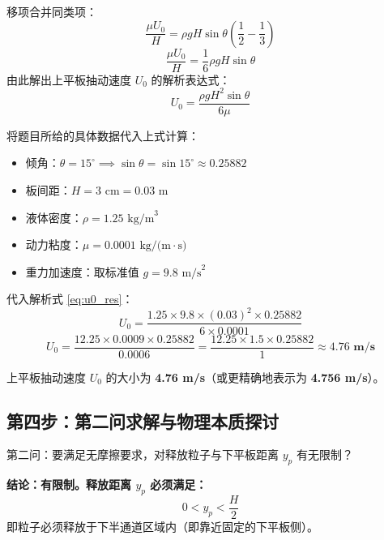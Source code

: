 \documentclass[11pt,a4paper]{article}
\begin{document}
移项合并同类项：
\begin{equation}
    \frac{\mu U_0}{H} = \rho g H \sin\theta \left( \frac{1}{2} - \frac{1}{3} \right)
\end{equation}
\begin{equation}
    \frac{\mu U_0}{H} = \frac{1}{6} \rho g H \sin\theta
\end{equation}
由此解出上平板抽动速度 $U_0$ 的解析表达式：
\begin{equation}
    U_0 = \frac{\rho g H^2 \sin\theta}{6\mu}
    \label{eq:u0_res}
\end{equation}

将题目所给的具体数据代入上式计算：
\begin{itemize}
    \item 倾角：$\theta = 15^\circ \implies \sin\theta = \sin 15^\circ \approx 0.25882$
    \item 板间距：$H = 3\text{ cm} = 0.03\text{ m}$
    \item 液体密度：$\rho = 1.25\text{ kg/m}^3$
    \item 动力粘度：$\mu = 0.0001\text{ kg/(m}\cdot\text{s)}$
    \item 重力加速度：取标准值 $g = 9.8\text{ m/s}^2$
\end{itemize}
代入解析式 \eqref{eq:u0_res}：
\begin{equation}
    U_0 = \frac{1.25 \times 9.8 \times (0.03)^2 \times 0.25882}{6 \times 0.0001}
\end{equation}
\begin{equation}
    U_0 = \frac{12.25 \times 0.0009 \times 0.25882}{0.0006} = \frac{12.25 \times 1.5 \times 0.25882}{1} \approx \mathbf{4.76\text{ m/s}}
\end{equation}

\begin{tcolorbox}[colback=green!5!white, colframe=green!60!black, title=第一问最终答案]
上平板抽动速度 $U_0$ 的大小为 \textbf{4.76 m/s}（或更精确地表示为 \textbf{4.756 m/s}）。
\end{tcolorbox}

\subsection{第四步：第二问求解与物理本质探讨}
第二问：要满足无摩擦要求，对释放粒子与下平板距离 $y_p$ 有无限制？

\textbf{结论：有限制。释放距离 $y_p$ 必须满足：}
\begin{equation}
    0 < y_p < \frac{H}{2}
\end{equation}
即粒子必须释放于下半通道区域内（即靠近固定的下平板侧）。
\end{document}
